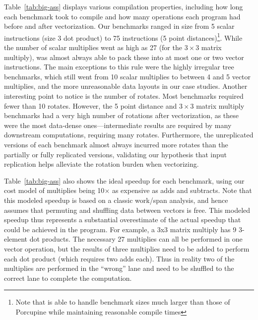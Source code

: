 Table~\ref{tab:big-ass} displays various compilation properties, including how long each benchmark took to compile and how many operations each program had before and after vectorization.
Our benchmarks ranged in size from 5 scalar instructions (size 3 dot product) to 75 instructions (5 point distances)\footnote{Note that \system is able to handle benchmark sizes much larger than those of Porcupine \cite{Porcupine} while maintaining reasonable compile times}.
While the number of scalar multiplies went as high as 27 (for the $3\times 3$ matrix multiply), \system was almost always able to pack these into at most one or two vector instructions.
The main exceptions to this rule were the highly irregular tree benchmarks, which still went from 10 scalar multiplies to between 4 and 5 vector multiplies, and the more unreasonable data layouts in our case studies.
Another interesting point to notice is the number of rotates. Most benchmarks required fewer than 10 rotates. However, the 5 point distance and $3\times 3$ matrix multiply benchmarks had a very high number of rotations after vectorization, as these were the most data-dense ones---intermediate results are required by many downstream computations, requiring many rotates.
Furthermore, the unreplicated versions of each benchmark almost always incurred more rotates than the partially or fully replicated versions, validating our hypothesis that input replication helps alleviate the rotation burden when vectorizing.

Table~\ref{tab:big-ass} also shows the ideal speedup for each benchmark, using our cost model of multiplies being 10$\times$ as expensive as adds and subtracts. Note that this modeled speedup is based on a classic work/span analysis, and hence assumes that permuting and shuffling data between vectors is free. This modeled speedup thus represents a substantial overestimate of the actual speedup that could be achieved in the program. For example, a \textsf{3x3} matrix multiply has 9 3-element dot products. The necessary 27 multiplies can all be performed in one vector operation, but the results of three multiplies need to be added to perform each dot product (which requires two adds each). Thus in reality two of the multiplies are performed in the ``wrong'' lane and need to be shuffled to the correct lane to complete the computation.

